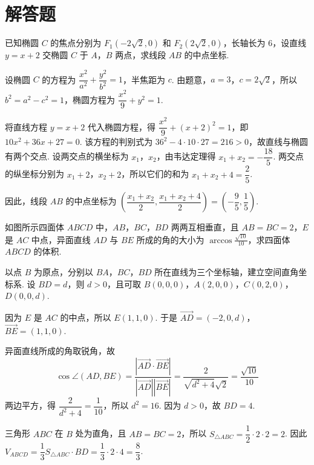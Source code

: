 \section{解答题}
\begin{problem}
已知椭圆 \(C\) 的焦点分别为 \(F_1(-2\sqrt{2},0)\) 和 \(F_2(2\sqrt{2},0)\)，长轴长为 \(6\)，设直线 \(y=x+2\) 交椭圆 \(C\) 于 \(A\)，\(B\) 两点，求线段 \(AB\) 的中点坐标.
\end{problem}

\begin{solution}
设椭圆 \(C\) 的方程为 \(\dfrac{x^2}{a^2}+\dfrac{y^2}{b^2}=1\)，半焦距为 \(c\). 由题意，\(a=3\)，\(c=2\sqrt{2}\)，所以 \(b^2=a^2-c^2=1\)，椭圆方程为 \(\dfrac{x^2}{9}+y^2=1\).

将直线方程 \(y=x+2\) 代入椭圆方程，得 \(\dfrac{x^2}{9}+(x+2)^2=1\)，即 \(10x^2+36x+27=0\). 该方程的判别式为 \(36^2-4\cdot10\cdot27=216>0\)，故直线与椭圆有两个交点. 设两交点的横坐标为 \(x_1\)，\(x_2\)，由韦达定理得 \(x_1+x_2=-\dfrac{18}{5}\). 两交点的纵坐标分别为 \(x_1+2\)，\(x_2+2\)，所以它们的和为 \(x_1+x_2+4=\dfrac{2}{5}\).

因此，线段 \(AB\) 的中点坐标为 \(\left(\dfrac{x_1+x_2}{2},\dfrac{x_1+x_2+4}{2}\right)=\left(-\dfrac95,\dfrac15\right)\).
\end{solution}

\begin{problem}
如图所示四面体 \(ABCD\) 中，\(AB\)，\(BC\)，\(BD\) 两两互相垂直，且 \(AB=BC=2\)，\(E\) 是 \(AC\) 中点，异面直线 \(AD\) 与 \(BE\) 所成的角的大小为 \(\arccos\frac{\sqrt{10}}{10}\)，求四面体 \(ABCD\) 的体积.

\end{problem}

\begin{solution}
以点 \(B\) 为原点，分别以 \(BA\)，\(BC\)，\(BD\) 所在直线为三个坐标轴，建立空间直角坐标系. 设 \(BD=d\)，则 \(d>0\)，且可取 \(B(0,0,0)\)，\(A(2,0,0)\)，\(C(0,2,0)\)，\(D(0,0,d)\).

因为 \(E\) 是 \(AC\) 的中点，所以 \(E(1,1,0)\). 于是 \(\overrightarrow{AD}=(-2,0,d)\)，\(\overrightarrow{BE}=(1,1,0)\).

异面直线所成的角取锐角，故
\[
\cos\angle(AD,BE)=\frac{\left|\overrightarrow{AD}\cdot\overrightarrow{BE}\right|}{\left|\overrightarrow{AD}\right|\left|\overrightarrow{BE}\right|}=\frac{2}{\sqrt{d^2+4}\sqrt{2}}=\frac{\sqrt{10}}{10}
\]
两边平方，得 \(\dfrac{2}{d^2+4}=\dfrac{1}{10}\)，所以 \(d^2=16\). 因为 \(d>0\)，故 \(BD=4\).

三角形 \(ABC\) 在 \(B\) 处为直角，且 \(AB=BC=2\)，所以 \(S_{\triangle ABC}=\dfrac12\cdot2\cdot2=2\). 因此 \(V_{ABCD}=\dfrac13S_{\triangle ABC}\cdot BD=\dfrac13\cdot2\cdot4=\dfrac83\).
\end{solution}

